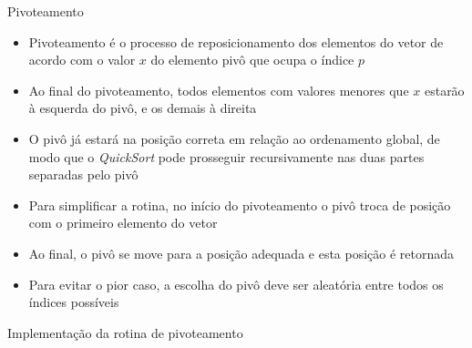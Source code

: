 \begin{frame}[fragile]{Pivoteamento}

    \begin{itemize}
        \item Pivoteamento é o processo de reposicionamento dos elementos do vetor
            de acordo com o valor $x$ do elemento pivô que ocupa o índice $p$

        \item Ao final do pivoteamento, todos elementos com valores menores que $x$ estarão
            à esquerda do pivô, e os demais à direita

        \item O pivô já estará na posição correta em relação ao ordenamento global, de modo que
            o  \textit{QuickSort} pode prosseguir recursivamente nas duas partes separadas
            pelo pivô

        \item Para simplificar a rotina, no início do pivoteamento o pivô troca de posição
            com o primeiro elemento do vetor

        \item Ao final, o pivô se move para a posição adequada e esta posição é retornada

        \item Para evitar o pior caso, a escolha do pivô deve ser aleatória entre todos 
            os índices possíveis
    \end{itemize}

\end{frame}



\begin{frame}[fragile]{Implementação da rotina de pivoteamento}
\end{frame}



